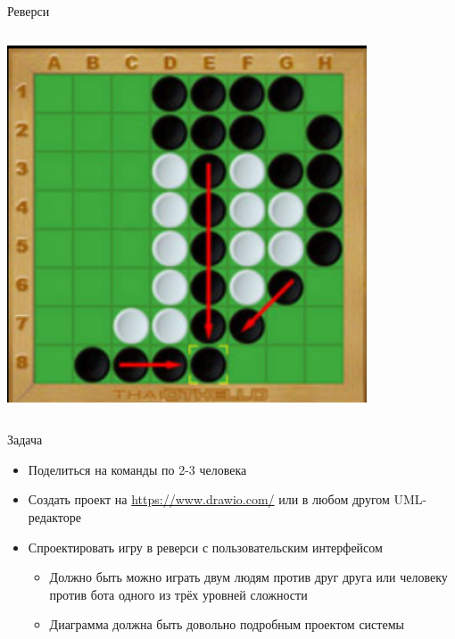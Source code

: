 \documentclass{../../slides-style}
\begin{document}
\begin{frame}{Реверси}
\begin{columns}
\begin{column}{0.3\textwidth}
\begin{center}
                    \includegraphics[width=0.8\textwidth]{reversi2.png}
                \end{center}
            \end{column}
        \end{columns}
    \end{frame}

    \begin{frame}{Задача}
        \begin{itemize}
            \item Поделиться на команды по 2-3 человека
            \item Создать проект на \url{https://www.drawio.com/} или в любом другом UML-редакторе
            \item Спроектировать игру в реверси с пользовательским интерфейсом
            \begin{itemize}
                \item Должно быть можно играть двум людям против друг друга или человеку против бота одного из трёх уровней сложности
                \item Диаграмма должна быть довольно подробным проектом системы
            \end{itemize}
        \end{itemize}
    \end{frame}
\end{document}
